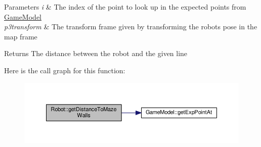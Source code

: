 \begin{DoxyParams}{Parameters}
{\em i} & The index of the point to look up in the expected points from \hyperlink{classGameModel}{Game\-Model} \\
\hline
{\em p3transform} & The transform frame given by transforming the robots pose in the map frame \\
\hline
\end{DoxyParams}
\begin{DoxyReturn}{Returns}
The distance between the robot and the given line 
\end{DoxyReturn}


Here is the call graph for this function\-:\nopagebreak
\begin{figure}[H]
\begin{center}
\leavevmode
\includegraphics[width=350pt]{classRobot_a36e8069df6f19bdb75bd60a62baba350_cgraph}
\end{center}
\end{figure}


